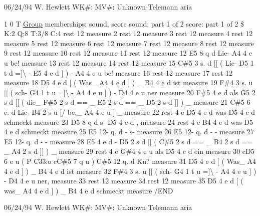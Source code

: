 06/24/94 W. Hewlett WK\#\+: MV\#\+: Unknown Telemann aria

1 0 T \hyperlink{class_group}{Group} memberships\+: sound, score sound\+: part 1 of 2 score\+: part 1 of 2 \$ K\+:2 Q\+:8 T\+:3/8 C\+:4 rest 12 measure 2 rest 12 measure 3 rest 12 measure 4 rest 12 measure 5 rest 12 measure 6 rest 12 measure 7 rest 12 measure 8 rest 12 measure 9 rest 12 measure 10 rest 12 measure 11 rest 12 measure 12 E5 8 q d Lie-\/ A4 4 e u be! measure 13 rest 12 measure 14 rest 12 measure 15 C\#5 3 s. d \mbox{[}\mbox{[} ( Lie-\/ D5 1 t d =\mbox{]}\textbackslash{} -\/ E5 4 e d \mbox{]} ) -\/ A4 4 e u be! measure 16 rest 12 measure 17 rest 12 measure 18 D5 4 e d \mbox{[} ( Was\+\_\+ A4 4 e d \mbox{]} ) \+\_\+ B4 4 e d ist measure 19 F\#4 3 s. u \mbox{[}\mbox{[} ( sch-\/ G4 1 t u =\mbox{]}\textbackslash{} -\/ A4 4 e u \mbox{]} ) -\/ D4 4 e u ner measure 20 F\#5 4 e d als G5 2 s d \mbox{[}\mbox{[} ( die\+\_\+ F\#5 2 s d == \+\_\+ E5 2 s d == \+\_\+ D5 2 s d \mbox{]}\mbox{]} ) \+\_\+ measure 21 C\#5 6 e. d Lie-\/ B4 2 s u \mbox{[}/ be,\+\_\+ A4 4 e u \mbox{]} \+\_\+ measure 22 rest 4 e D5 4 e d was D5 4 e d schmeckt measure 23 D5 8 q d s-\/ D5 4 e d , measure 24 rest 4 e B4 4 e d was D5 4 e d schmeckt measure 25 E5 12-\/ q. d -\/ s-\/ measure 26 E5 12-\/ q. d -\/ -\/ measure 27 E5 12-\/ q. d -\/ -\/ measure 28 E5 4 e d -\/ D5 2 s d \mbox{[}\mbox{[} (  C\#5 2 s d == \+\_\+ B4 2 s d == \+\_\+ A4 2 s d \mbox{]}\mbox{]} ) \+\_\+ measure 29 rest 4 e G\#4 4 e u als D5 4 e d ein measure 30 c\+D5 6 e u ( P C33\+:o cC\#5 7 q u ) C\#5 12 q. d Ku? measure 31 D5 4 e d \mbox{[} ( Was\+\_\+ A4 4 e d \mbox{]} ) \+\_\+ B4 4 e d ist measure 32 F\#4 3 s. u \mbox{[}\mbox{[} ( sch-\/ G4 1 t u =\mbox{]}\textbackslash{} -\/ A4 4 e u \mbox{]} ) -\/ D4 4 e u ner, measure 33 rest 12 measure 34 rest 12 measure 35 D5 4 e d \mbox{[} ( was\+\_\+ A4 4 e d \mbox{]} ) \+\_\+ B4 4 e d schmeckt measure /\+E\+ND

06/24/94 W. Hewlett WK\#\+: MV\#\+: Unknown Telemann aria

